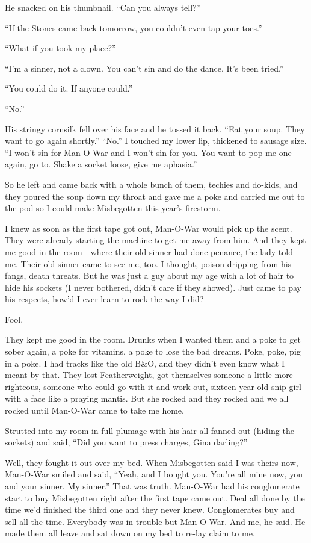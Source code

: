 He snacked on his thumbnail. “Can you always tell?”

“If the Stones came back tomorrow, you couldn't even tap your toes.”

“What if you took my place?”

“I'm a sinner, not a clown. You can't sin and do the dance. It's been tried.”

“You could do it. If anyone could.”

“No.”

His stringy cornsilk fell over his face and he tossed it back. “Eat your soup. They want to go again shortly.”
“No.” I touched my lower lip, thickened to sausage size. “I won't sin for Man-O-War and I won't sin for you. You want to pop me one again, go to. Shake a socket loose, give me aphasia.”

So he left and came back with a whole bunch of them, techies and do-kids, and they poured the soup down my throat and gave me a poke and carried me out to the pod so I could make Misbegotten this year's firestorm.

I knew as soon as the first tape got out, Man-O-War would pick up the scent. They were already starting the machine to get me away from him. And they kept me good in the room—where their old sinner had done penance, the lady told me. Their old sinner came to see me, too. I thought, poison dripping from his fangs, death threats. But he was just a guy about my age with a lot of hair to hide his sockets (I never bothered, didn't care if they showed). Just came to pay his respects, how'd I ever learn to rock the way I did?

Fool.

They kept me good in the room. Drunks when I wanted them and a poke to get sober again, a poke for vitamins, a poke to lose the bad dreams. Poke, poke, pig in a poke. I had tracks like the old B\&O, and they didn't even know what I meant by that. They lost Featherweight, got themselves someone a little more righteous, someone who could go with it and work out, sixteen-year-old snip girl with a face like a praying mantis. But she rocked and they rocked and we all rocked until Man-O-War came to take me home.

Strutted into my room in full plumage with his hair all fanned out (hiding the sockets) and said, “Did you want to press charges, Gina darling?”

Well, they fought it out over my bed. When Misbegotten said I was theirs now, Man-O-War smiled and said, “Yeah, and I bought you. You're all mine now, you and your sinner. My sinner.” That was truth. Man-O-War had his conglomerate start to buy Misbegotten right after the first tape came out. Deal all done by the time we'd finished the third one and they never knew. Conglomerates buy and sell all the time. Everybody was in trouble but Man-O-War. And me, he said. He made them all leave and sat down on my bed to re-lay claim to me.

